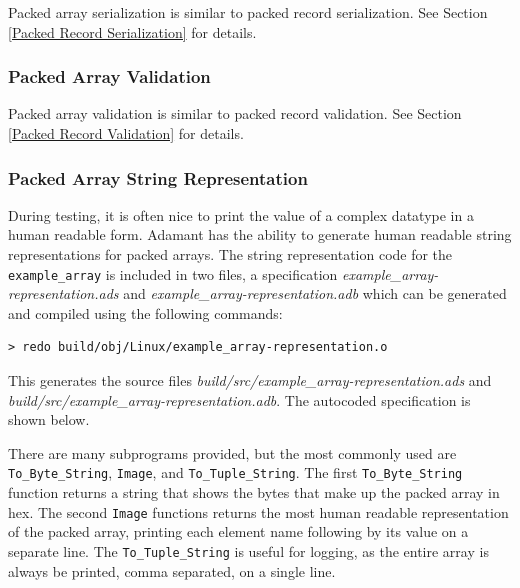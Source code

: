 Packed array serialization is similar to packed record serialization. See Section \ref{Packed Record Serialization} for details.

\subsubsection{Packed Array Validation}

Packed array validation is similar to packed record validation. See Section \ref{Packed Record Validation} for details.

\subsubsection{Packed Array String Representation}

During testing, it is often nice to print the value of a complex datatype in a human readable form. Adamant has the ability to generate human readable string representations for packed arrays. The string representation code for the \texttt{example\_array} is included in two files, a specification \textit{example\_array-representation.ads} and \textit{example\_array-representation.adb} which can be generated and compiled using the following commands: 

\vspace{5mm} %
\begin{verbatim}
> redo build/obj/Linux/example_array-representation.o
\end{verbatim}
\vspace{5mm} %

This generates the source files \textit{build/src/example\_array-representation.ads} and \textit{build/src/example\_array-representation.adb}. The autocoded specification is shown below.


There are many subprograms provided, but the most commonly used are \texttt{To\_Byte\_String}, \texttt{Image}, and \texttt{To\_Tuple\_String}. The first \texttt{To\_Byte\_String} function returns a string that shows the bytes that make up the packed array in hex. The second \texttt{Image} functions returns the most human readable representation of the packed array, printing each element name following by its value on a separate line. The \texttt{To\_Tuple\_String} is useful for logging, as the entire array is always be printed, comma separated, on a single line. \\

